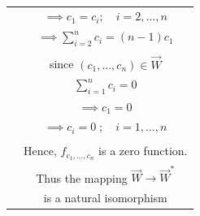\begin{table}[ht]
\begin{center}
\begin{tabular}{|c|c|}
& $\implies c_1 = c_i; \quad i = 2,\hdots,n$ \\
& $\implies \sum_{i=2}^n c_i = (n-1)c_1$ \\
& \\
& since $(c_1,\hdots,c_n) \in \vec{W}$ \\
& $\sum_{i=1}^n c_i = 0$ \\
& $\implies c_1 = 0$ \\
& $\implies c_i = 0 \; ; \quad i = 1,\hdots,n$ \\
& \\
& Hence, $f_{c_1,\hdots,c_n}$ is a zero function. \\
& Thus the mapping $\vec{W} \xrightarrow{} \vec{W}^*$ \\
& is a natural isomorphism \\
\hline
\end{tabular}
\end{center}
\caption{}
\label{table:solutions/3/6/1/b/}
\end{table}
